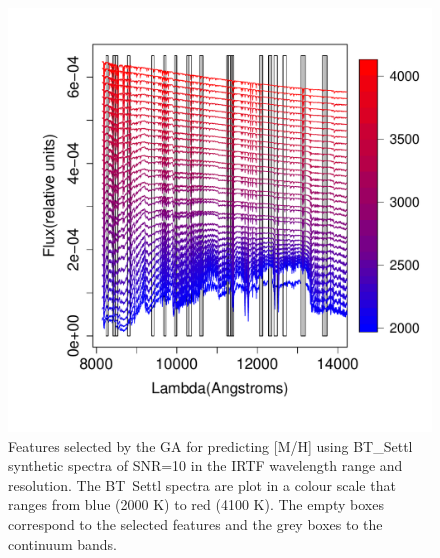 \begin {figure}
 \centering
  \includegraphics[scale=0.55]{figs/BT-spectraAtIRTF-10-mh}
  \caption{Features selected by the GA for predicting [M/H] using
    BT\_Settl synthetic spectra of SNR=10 in the IRTF wavelength range
    and resolution. The BT\ Settl spectra are plot in a colour scale
    that ranges from blue (2000 K) to red (4100 K). The empty boxes
    correspond to the selected features and the grey boxes to the
    continuum bands.}
\label{fig:irtf-met-10}
\end {figure}

